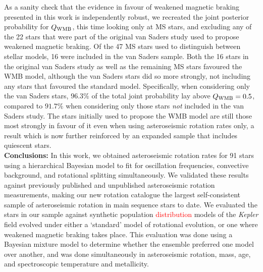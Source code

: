 \documentclass[12pt]{article}
\newcommand{\rtwo}[1]{\textcolor{red}{{#1}}}
\begin{document}
As a sanity check that the evidence in favour of weakened magnetic braking presented in this work is independently robust, we recreated the joint posterior probability for $Q_{\rm WMB}$, this time looking only at MS stars, and excluding any of the 22 stars that were part of the original van Saders study used to propose weakened magnetic braking. Of the 47 MS stars used to distinguish between stellar models, 16 were included in the van Saders sample. Both the 16 stars in the original van Saders study as well as the remaining MS stars favoured the WMB model, although the van Saders stars did so more strongly, not including any stars that favoured the standard model. Specifically, when considering only the van Saders stars, $96.3\%$ of the total joint probability lay above $Q_{\rm WMB} = 0.5$, compared to $91.7\%$ when considering only those stars \emph{not} included in the van Saders study. The stars initially used to propose the WMB model are still those most strongly in favour of it even when using asteroseismic rotation rates only, a result which is now further reinforced by an expanded sample that includes quiescent stars.\\


\textbf{Conclusions:} In this work, we obtained asteroseismic rotation rates for 91 stars using a hierarchical Bayesian model to fit for oscillation frequencies, convective background, and rotational splitting simultaneously. We validated these results against previously published and unpublished asteroseismic rotation measurements, making our new rotation catalogue the largest self-consistent sample of asteroseismic rotation in main sequence stars to date. We evaluated the stars in our sample against synthetic population \rtwo{distribution} models of the \textit{Kepler} field evolved under either a `standard' model of rotational evolution, or one where weakened magnetic braking takes place. This evaluation was done using a Bayesian mixture model to determine whether the ensemble preferred one model over another, and was done simultaneously in asteroseismic rotation, mass, age, and spectroscopic temperature and metallicity.\\
\end{document}
